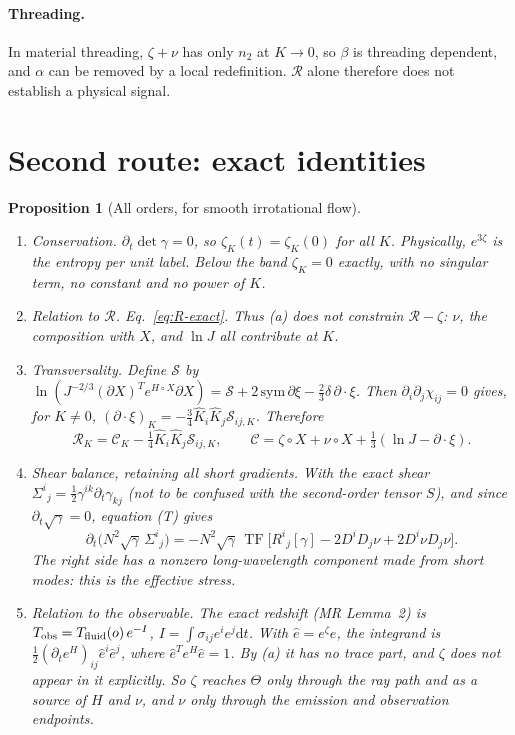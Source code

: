\documentclass[10pt]{article}
\newtheorem{proposition}{Proposition}
\newcommand{\dd}{\mathrm{d}}
\newcommand{\TF}{\operatorname{TF}}
\newcommand{\R}{\mathcal R}
\newcommand{\Kh}{\hat K}
\begin{document}
\paragraph{Threading.} In material threading, $\zeta+\nu$ has only $n_2$ at $K\to0$, so $\beta$ is threading dependent, and $\alpha$ can be removed by a local redefinition. $\R$ alone therefore does not establish a physical signal.

\section{Second route: exact identities}\label{sec:route2}

\begin{proposition}[All orders, for smooth irrotational flow]\label{prop:exact}\
\begin{enumerate}
\item[(a)] \emph{Conservation.} $\partial_t\det\gamma=0$, so $\zeta_K(t)=\zeta_K(0)$ for all $K$. Physically, $e^{3\zeta}$ is the entropy per unit label. Below the band $\zeta_K=0$ exactly, with no singular term, no constant and no power of $K$.
\item[(b)] \emph{Relation to $\R$.} Eq.~\eqref{eq:R-exact}. Thus (a) does not constrain $\R-\zeta$: $\nu$, the composition with $X$, and $\ln J$ all contribute at $K$.
\item[(c)] \emph{Transversality.} Define $\mathcal S$ by $\ln(J^{-2/3}(\partial X)^T\!e^{H\circ X}\partial X)=\mathcal S+2\,\mathrm{sym}\,\partial\xi-\frac23\delta\,\partial\!\cdot\!\xi$. Then $\partial_i\partial_j\chi_{ij}=0$ gives, for $K\ne0$, $(\partial\!\cdot\!\xi)_K=-\frac34\Kh_i\Kh_j\mathcal S_{ij,K}$. Therefore
\begin{equation}\label{eq:all-orders}
\R_K=\mathcal C_K-\tfrac14\Kh_i\Kh_j\mathcal S_{ij,K},\qquad\mathcal C=\zeta\circ X+\nu\circ X+\tfrac13(\ln J-\partial\!\cdot\!\xi).
\end{equation}
\item[(d)] \emph{Shear balance, retaining all short gradients.} With the exact shear $\Sigma^i{}_j=\tfrac12\gamma^{ik}\partial_t\gamma_{kj}$ (not to be confused with the second-order tensor $S$), and since $\partial_t\sqrt\gamma=0$, equation (T) gives
\begin{equation}\label{eq:balance}
\partial_t\big(N^2\sqrt\gamma\,\Sigma^i{}_j\big)=-N^2\sqrt\gamma\,\TF\big[R^i{}_j[\gamma]-2D^iD_j\nu+2D^i\nu D_j\nu\big].
\end{equation}
The right side has a nonzero long-wavelength component made from short modes: this is the effective stress.
\item[(e)] \emph{Relation to the observable.} The exact redshift (MR Lemma~2) is $T_{\rm obs}=T_{\rm fluid}(o)\,e^{-I}$, $I=\int\sigma_{ij}e^ie^j\dd t$. With $\hat e=e^{\zeta}e$, the integrand is $\frac12(\partial_te^{H})_{ij}\hat e^i\hat e^j$, where $\hat e^{T}e^{H}\hat e=1$. By (a) it has no trace part, and $\zeta$ does not appear in it explicitly. So $\zeta$ reaches $\Theta$ only through the ray path and as a source of $H$ and $\nu$, and $\nu$ only through the emission and observation endpoints.
\end{enumerate}
\end{proposition}
\end{document}
